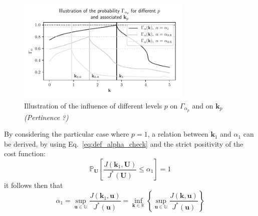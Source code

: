 \documentclass[preprint, 1p]{elsarticle}
\newcommand{\Prob}{\mathbb{P}}
\newcommand{\checka}{{\alpha}}
\newcommand{\checkk}{\mathbf{k}}
\newcommand{\checkkp}{{\mathbf{k}}_p}
\newcommand{\Kspace}{\mathbb{K}}
\newcommand{\Uspace}{\mathbb{U}}
\newcommand{\victor}[1]{{\itshape\color{green} ({#1})}}
\begin{document}
\begin{figure}[!ht]
\centering
\includegraphics[width = 8.3cm]{Figures/illu_alpha_p.pdf}
\caption{Illustration of the influence of different levels $p$ on $\Gamma_{\alpha_p}$ and on $\mathbf{k}_p$ \victor{Pertinence ?}}
\label{fig:illu_alpha_p}
\end{figure}





By considering the particular case where $p=1$, a relation between $\checkk_1$ and $\checka_1$ can be derived, by using Eq.~\eqref{eq:def_alpha_check} and the strict positivity of the cost function:
\begin{equation}
  \label{eq:def_alpha1}
  \Prob_{\mathbf{U}}\left[\frac{J(\mathbf{k}_1,\mathbf{U})}{ J^*(\mathbf{U}) } \leq \checka_1\right]=1
\end{equation}
it follows then that 
\begin{equation}
  \label{eq:upper_bound_alpha_check}
  \checka_1 = \sup_{\mathbf{u}\in\Uspace} \frac{J(\mathbf{k}_1,\mathbf{u})}{J^*(\mathbf{u})} =  \inf_{\mathbf{k}\in\Kspace} \left\{ \sup_{\mathbf{u}\in\Uspace} \frac{J(\mathbf{k},\mathbf{u})}{J^*(\mathbf{u})} \right\} 
\end{equation}
\end{document}
